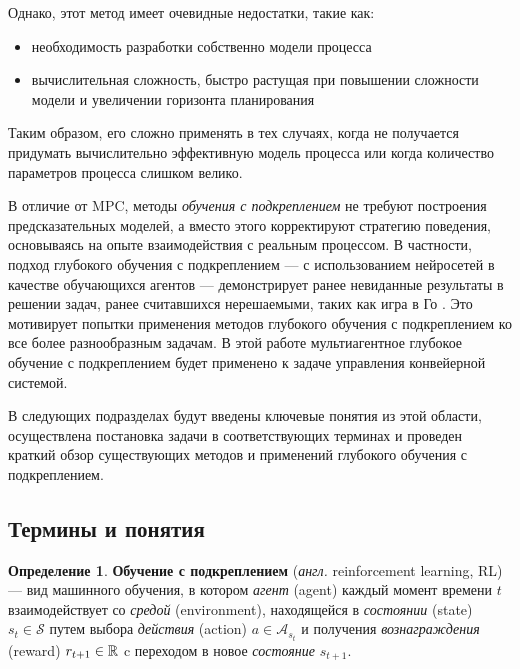 \documentclass[specification,annotation,times]{itmo-student-thesis}
\theoremstyle{definition}
\newtheorem{definition-ru}{Определение}
\begin{document}
Однако, этот метод имеет очевидные недостатки, такие как:

\begin{itemize}
\item необходимость разработки собственно модели процесса
\item вычислительная сложность, быстро растущая при повышении сложности модели и
  увеличении горизонта планирования
\end{itemize}

Таким образом, его сложно применять в тех случаях, когда не получается придумать
вычислительно эффективную модель процесса или когда количество параметров
процесса слишком велико.

В отличие от MPC, методы \textit{обучения с подкреплением} не требуют построения
предсказательных моделей, а вместо этого корректируют стратегию поведения,
основываясь на опыте взаимодействия с реальным процессом. В частности, подход
глубокого обучения с подкреплением --- с использованием нейросетей в качестве
обучающихся агентов --- демонстрирует ранее невиданные результаты в решении
задач, ранее считавшихся нерешаемыми, таких как игра в Го
\cite{silver2016mastering}. Это мотивирует попытки применения методов глубокого
обучения с подкреплением ко все более разнообразным задачам. В этой работе
мультиагентное глубокое обучение с подкреплением будет применено к задаче
управления конвейерной системой.

В следующих подразделах будут введены ключевые понятия из этой области,
осуществлена постановка задачи в соответствующих терминах и проведен краткий
обзор существующих методов и применений глубокого обучения с подкреплением.

\subsection{Термины и понятия}

\begin{definition-ru}
  \textbf{Обучение с подкреплением} (\textit{англ.} reinforcement learning, RL) --- вид машинного
  обучения, в котором \textit{агент} (agent) каждый момент времени $t$ 
  взаимодействует со \textit{средой} (environment), находящейся в
  \textit{состоянии} (state) $s_t \in \mathcal{S}$ путем выбора
  \textit{действия} (action) $a \in \mathcal{A}_{s_t}$ и получения
  \textit{вознаграждения} (reward) $r_{t+1} \in \Bbb{R}$ c переходом в новое
  \textit{состояние} $s_{t+1}$.
\end{definition-ru}
\end{document}
